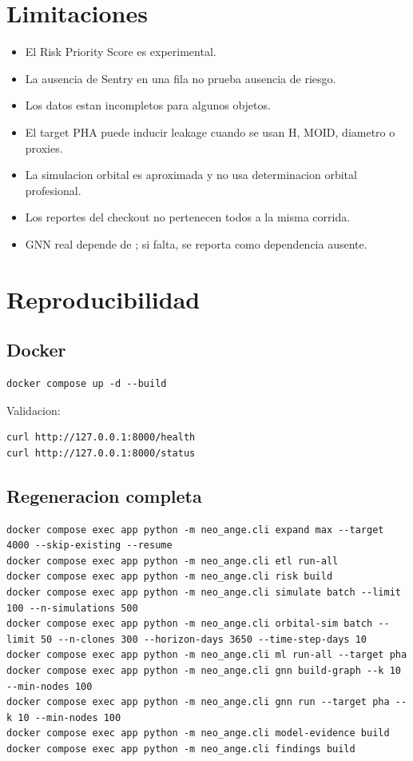 \documentclass[11pt,letterpaper]{article}
\newcommand{\code}[1]{\texttt{\detokenize{#1}}}
\begin{document}
\section{Limitaciones}

\begin{itemize}
  \item El Risk Priority Score es experimental.
  \item La ausencia de Sentry en una fila no prueba ausencia de riesgo.
  \item Los datos estan incompletos para algunos objetos.
  \item El target PHA puede inducir leakage cuando se usan H, MOID, diametro o proxies.
  \item La simulacion orbital es aproximada y no usa determinacion orbital profesional.
  \item Los reportes del checkout no pertenecen todos a la misma corrida.
  \item GNN real depende de \code{torch-geometric}; si falta, se reporta como dependencia ausente.
\end{itemize}

\section{Reproducibilidad}

\subsection{Docker}

\begin{lstlisting}
docker compose up -d --build
\end{lstlisting}

Validacion:

\begin{lstlisting}
curl http://127.0.0.1:8000/health
curl http://127.0.0.1:8000/status
\end{lstlisting}

\subsection{Regeneracion completa}

\begin{lstlisting}
docker compose exec app python -m neo_ange.cli expand max --target 4000 --skip-existing --resume
docker compose exec app python -m neo_ange.cli etl run-all
docker compose exec app python -m neo_ange.cli risk build
docker compose exec app python -m neo_ange.cli simulate batch --limit 100 --n-simulations 500
docker compose exec app python -m neo_ange.cli orbital-sim batch --limit 50 --n-clones 300 --horizon-days 3650 --time-step-days 10
docker compose exec app python -m neo_ange.cli ml run-all --target pha
docker compose exec app python -m neo_ange.cli gnn build-graph --k 10 --min-nodes 100
docker compose exec app python -m neo_ange.cli gnn run --target pha --k 10 --min-nodes 100
docker compose exec app python -m neo_ange.cli model-evidence build
docker compose exec app python -m neo_ange.cli findings build
\end{lstlisting}
\end{document}
